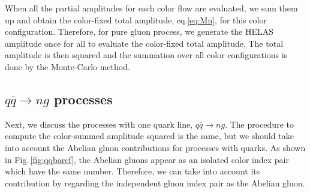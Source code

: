 \documentclass[a4paper,11pt]{article}
\begin{document}
 When all the partial amplitudes for each color flow are
 evaluated, we sum them up and obtain the color-fixed total
amplitude, eq.\eqref{eq:Mn}, for this color configuration. Therefore,
for pure gluon process, we generate the HELAS amplitude once for all to evaluate
the color-fixed total amplitude. The total amplitude is then squared and
 the summation over all color
configurations is done by the
Monte-Carlo method.

\subsection{$q\overline{q}\rightarrow ng$ processes}
Next, we discuss the processes with one quark line,
$q\overline{q}\rightarrow ng$. The procedure to compute the color-summed amplitude squared is the same, but we should take into account
the Abelian gluon contributions for processes with quarks. As shown in Fig.\,\ref{fig:qqbarcf}, the Abelian gluons appear
as an isolated color index pair which have the same number. Therefore, we can take into account its contribution by regarding the independent gluon index pair as the
Abelian gluon.
\end{document}
